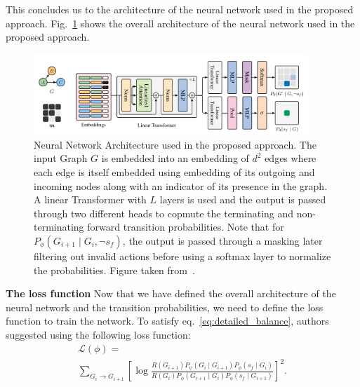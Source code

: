 \documentclass{lxaiproposal}
\begin{document}
    This concludes us to the architecture of the neural network used in the proposed approach. Fig.~\ref{fig:nn_architecture}
    shows the overall architecture of the neural network used in the proposed approach.

    \begin{figure}
        \centering
        \includegraphics[width=0.92\textwidth]{figures/nn_architecture}
        \caption{Neural Network Architecture used in the proposed approach.
        The input Graph $G$ is embedded into an embedding of $d^2$ edges where each edge is itself embedded using
        embedding of its outgoing and incoming nodes along with an indicator of its presence in the graph. A linear Transformer
        with $L$ layers is used and the output is passed through two different heads to copmute the terminating and non-terminating
        forward transition probabilities. Note that for $P_{\phi}(G_{i+1} \mid G_i, \neg s_f)$, the output is passed through a
        masking later filtering out invalid actions before using a softmax layer to normalize the probabilities. Figure taken from~\cite{deleu2022daggflownet}.}
        \label{fig:nn_architecture}
    \end{figure}

    \vspace*{3mm}

    \textbf{The loss function} Now that we have defined the overall architecture of the neural network and the
    transition probabilities, we need to define the loss function to train the network.
    To satisfy eq.~\eqref{eq:detailed_balance}, authors suggested using the following loss function:
    \begin{equation}
        \begin{array}{l}
            \mathcal{L}(\phi) = \\
            \sum_{G_i \to G_{i+1}} \left[ \log
            \frac{R(G_{i+1})P_{\psi}(G_i \mid G_{i+1})P_{\phi}(s_f \mid G_i)}{R(G_i)P_{\phi}(G_{i+1} \mid G_i)P_{\phi}(s_f \mid G_{i+1})} \right]^2 .
        \end{array}
        \label{eq:loss_function}
    \end{equation}
\end{document}
